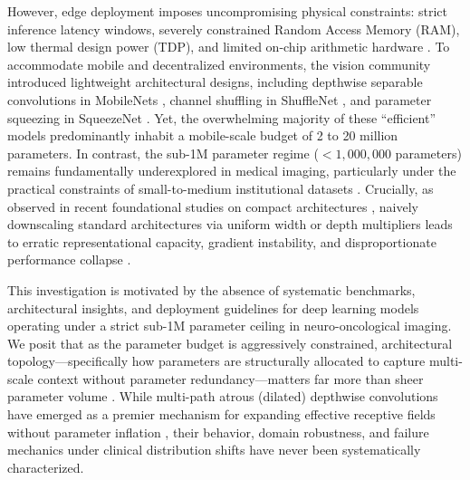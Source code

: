 However, edge deployment imposes uncompromising physical constraints: strict inference latency windows, severely constrained Random Access Memory (RAM), low thermal design power (TDP), and limited on-chip arithmetic hardware \cite{12, 33, 41}. To accommodate mobile and decentralized environments, the vision community introduced lightweight architectural designs, including depthwise separable convolutions in MobileNets \cite{15, 37}, channel shuffling in ShuffleNet \cite{32}, and parameter squeezing in SqueezeNet \cite{17}. Yet, the overwhelming majority of these ``efficient'' models predominantly inhabit a mobile-scale budget of 2 to 20 million parameters. In contrast, the sub-1M parameter regime ($<1,000,000$ parameters) remains fundamentally underexplored in medical imaging, particularly under the practical constraints of small-to-medium institutional datasets \cite{3, 21}. Crucially, as observed in recent foundational studies on compact architectures \cite{21}, naively downscaling standard architectures via uniform width or depth multipliers leads to erratic representational capacity, gradient instability, and disproportionate performance collapse \cite{21, 24}.

This investigation is motivated by the absence of systematic benchmarks, architectural insights, and deployment guidelines for deep learning models operating under a strict sub-1M parameter ceiling in neuro-oncological imaging. We posit that as the parameter budget is aggressively constrained, architectural topology---specifically how parameters are structurally allocated to capture multi-scale context without parameter redundancy---matters far more than sheer parameter volume \cite{21}. While multi-path atrous (dilated) depthwise convolutions have emerged as a premier mechanism for expanding effective receptive fields without parameter inflation \cite{5, 21}, their behavior, domain robustness, and failure mechanics under clinical distribution shifts have never been systematically characterized.

